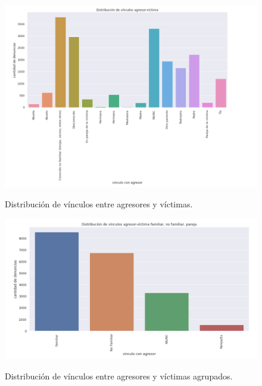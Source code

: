 \documentclass[10 pt]{article}
\begin{document}
\begin{figure}
\begin{center}
\includegraphics[scale=.29]{imagenes/distribucion_vinculos_agresor_vctima.png}
\vspace{-1em}
\caption{Distribución de vínculos entre agresores y víctimas.}
\vspace{-1.5em}
\label{vinculos}
\end{center}
\end{figure}

\begin{figure}[H]
\begin{center}
\includegraphics[scale=.29]{imagenes/vinculos_agresor_victima_agrupado.png}
\vspace{1.5em}
\caption{Distribución de vínculos entre agresores y víctimas agrupados.}
\vspace{1.5em}
\label{vinculosagrupados}
\end{center}
\end{figure}

\newpage


\end{document}
